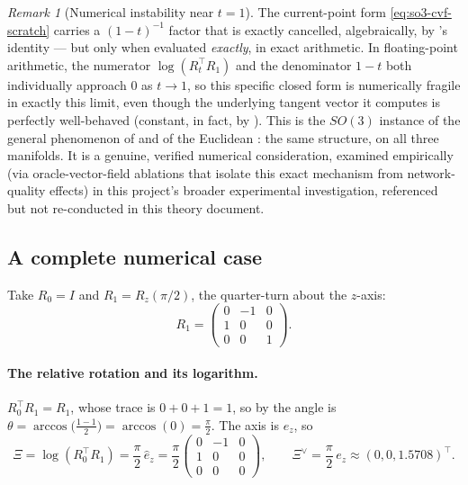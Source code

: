 \documentclass[11pt,a4paper]{report}
\theoremstyle{definition}
\theoremstyle{remark}
\newtheorem{remark}[remark]{Remark}
\begin{document}
\begin{remark}[Numerical instability near $t=1$]
\label{rem:so3-singularity-remark}
The current-point form \eqref{eq:so3-cvf-scratch} carries a $(1-t)^{-1}$
factor that is exactly cancelled, algebraically, by
's identity --- but only when evaluated
\emph{exactly}, in exact arithmetic. In floating-point arithmetic, the
numerator $\log(R_t^\top R_1)$ and the denominator $1-t$ both individually
approach $0$ as $t\to1$, so this specific closed form is numerically
fragile in exactly this limit, even though the underlying tangent vector
it computes is perfectly well-behaved (constant, in fact, by
). This is the $SO(3)$ instance of the
general phenomenon of  and of the Euclidean
: the same structure, on all three
manifolds. It is a genuine, verified numerical
consideration, examined empirically (via oracle-vector-field ablations
that isolate this exact mechanism from network-quality effects) in this
project's broader experimental investigation, referenced but not
re-conducted in this theory document.
\end{remark}

\subsection{A complete numerical case}
\label{sec:rfm-so3-numeric}

Take $R_0=I$ and $R_1=R_z(\pi/2)$, the quarter-turn about the $z$-axis:
\[
R_1 =
\begin{pmatrix}
0&-1&0\\ 1&0&0\\ 0&0&1
\end{pmatrix} .
\]

\paragraph{The relative rotation and its logarithm.}
$R_0^\top R_1=R_1$, whose trace is $0+0+1=1$, so by
 the angle is
$\theta=\arccos\bigl(\tfrac{1-1}{2}\bigr)=\arccos(0)=\tfrac\pi2$. The axis is
$e_z$, so
\[
\Xi = \log(R_0^\top R_1) = \frac\pi2\,\widehat e_z
= \frac\pi2\begin{pmatrix}0&-1&0\\1&0&0\\0&0&0\end{pmatrix} ,
\qquad
\Xi^\vee = \frac\pi2\,e_z \approx (0,0,1.5708)^\top .
\]
\end{document}
